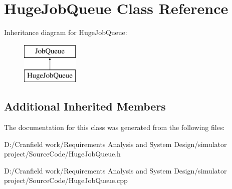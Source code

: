 \hypertarget{class_huge_job_queue}{}\section{Huge\+Job\+Queue Class Reference}
\label{class_huge_job_queue}
Inheritance diagram for Huge\+Job\+Queue\+:\begin{figure}[H]
\begin{center}
\leavevmode
\includegraphics[height=2.000000cm]{class_huge_job_queue}
\end{center}
\end{figure}
\subsection*{Additional Inherited Members}


The documentation for this class was generated from the following files\+:\begin{DoxyCompactItemize}
\item 
D\+:/\+Cranfield work/\+Requirements Analysis and System Design/simulator project/\+Source\+Code/Huge\+Job\+Queue.\+h\item 
D\+:/\+Cranfield work/\+Requirements Analysis and System Design/simulator project/\+Source\+Code/Huge\+Job\+Queue.\+cpp\end{DoxyCompactItemize}
